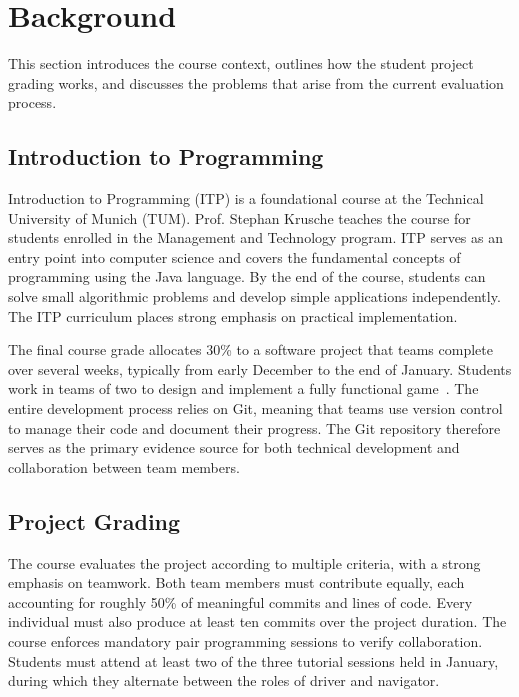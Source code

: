 \documentclass[sigconf]{acmart}
\begin{document}
\section{Background}
This section introduces the course context, outlines how the student project grading works, and discusses the problems that arise from the current evaluation process.

\subsection{Introduction to Programming}

Introduction to Programming (ITP) is a foundational course at the Technical University of Munich (TUM). Prof. Stephan Krusche teaches the course for students enrolled in the Management and Technology program. ITP serves as an entry point into computer science and covers the fundamental concepts of programming using the Java language. By the end of the course, students can solve small algorithmic problems and develop simple applications independently. The ITP curriculum places strong emphasis on practical implementation.

The final course grade allocates 30\% to a software project that teams complete over several weeks, typically from early December to the end of January. Students work in teams of two to design and implement a fully functional game~\cite{michaelsen2004tbl}. The entire development process relies on Git, meaning that teams use version control to manage their code and document their progress. The Git repository therefore serves as the primary evidence source for both technical development and collaboration between team members.

\subsection{Project Grading}

The course evaluates the project according to multiple criteria, with a strong emphasis on teamwork. Both team members must contribute equally, each accounting for roughly 50\% of meaningful commits and lines of code. Every individual must also produce at least ten commits over the project duration. The course enforces mandatory pair programming sessions to verify collaboration. Students must attend at least two of the three tutorial sessions held in January, during which they alternate between the roles of driver and navigator.
\end{document}
